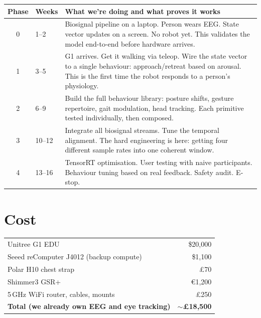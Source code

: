 \documentclass[11pt,a4paper]{article}
\begin{document}
\begin{table}[H]
\centering\small
\begin{tabularx}{\textwidth}{clX}
\toprule
\textbf{Phase} & \textbf{Weeks} & \textbf{What we're doing and what proves it works} \\
\midrule
0 & 1--2 & Biosignal pipeline on a laptop. Person wears EEG. State vector updates on a screen. No robot yet. This validates the model end-to-end before hardware arrives. \\
1 & 3--5 & G1 arrives. Get it walking via teleop. Wire the state vector to a single behaviour: approach/retreat based on arousal. This is the first time the robot responds to a person's physiology. \\
2 & 6--9 & Build the full behaviour library: posture shifts, gesture repertoire, gait modulation, head tracking. Each primitive tested individually, then composed. \\
3 & 10--12 & Integrate all biosignal streams. Tune the temporal alignment. The hard engineering is here: getting four different sample rates into one coherent window. \\
4 & 13--16 & TensorRT optimisation. User testing with naive participants. Behaviour tuning based on real feedback. Safety audit. E-stop. \\
\bottomrule
\end{tabularx}
\end{table}

\section{Cost}

\begin{table}[H]
\centering\small
\begin{tabular}{lr}
\toprule
Unitree G1 EDU & \$20,000 \\
Seeed reComputer J4012 (backup compute) & \$1,100 \\
Polar H10 chest strap & \pounds 70 \\
Shimmer3 GSR+ & \euro 1,200 \\
5\,GHz WiFi router, cables, mounts & \pounds 250 \\
\midrule
\textbf{Total (we already own EEG and eye tracking)} & $\sim$\textbf{\pounds 18,500} \\
\bottomrule
\end{tabular}
\end{table}
\end{document}
